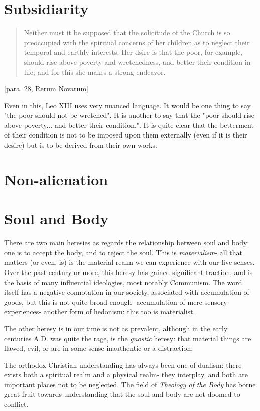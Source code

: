 \documentclass[10pt,letterpaper,openany]{book}
\begin{document}
\section{Subsidiarity}

\begin{quote}
  Neither must it be supposed that the solicitude of the Church is so preoccupied with the spiritual concerns of her children as to neglect their temporal and earthly interests. Her dsire is that the poor, for example, should rise above poverty and wretchedness, and better their condition in life; and for this she makes a strong endeavor.
\end{quote} [para. 28, Rerum Novarum]

Even in this, Leo XIII uses very nuanced language. It would be one thing to say "the poor should not be wretched". It is another to say that the "poor should rise above poverty... and better their condition.".  It is quite clear that the betterment of their condition is not to be imposed upon them externally (even if it is their desire) but is to be derived from their own works.

\section{Non-alienation}

\section{Soul and Body}

There are two main heresies as regards the relationship between soul and body: one is to accept the body, and to reject the soul. This is \textit{materialism}- all that matters (or even, is) is the material realm we can experience with our five senses. Over the past century or more, this heresy has gained significant traction, and is the basis of many influential ideologies, most notably Communism. The word itself has a negative connotation in our society, associated with accumulation of goods, but this is not quite broad enough- accumulation of mere sensory experiences- another form of hedonism: this too is materialist.

The other heresy is in our time is not as prevalent, although in the early centuries A.D. was quite the rage, is the \textit{gnostic} heresy: that material things are flawed, evil, or are in some sense inauthentic or a distraction.

The orthodox Christian understanding has always been one of dualism: there exists both a spiritual realm and a physical realm- they interplay, and both are important places not to be neglected. The field of \textit{Theology of the Body} has borne great fruit towards understanding that the soul and body are not doomed to conflict.
\end{document}
